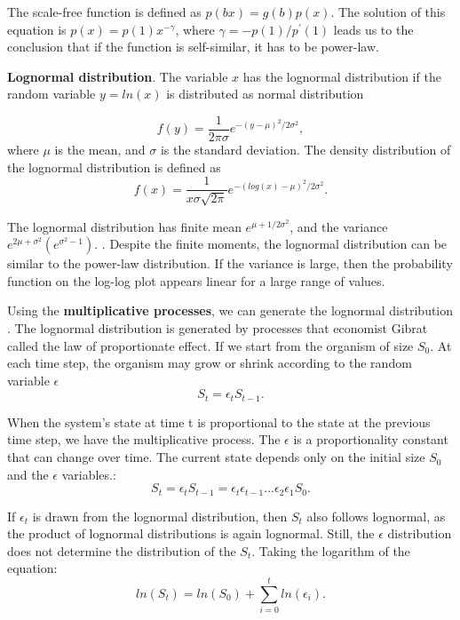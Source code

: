 The scale-free function is defined as $p(bx) = g(b)p(x)$. The solution of this equation is $p(x)=p(1)x^{-\gamma}$, where  $\gamma=-p(1)/p^{'}(1)$ leads us to the conclusion that if the function is self-similar, it has to be power-law.

\textbf{Lognormal distribution}. The variable $x$ has the lognormal distribution if the random variable $y=ln(x)$ is distributed as normal distribution \cite{limpert2001log} 

\begin{equation}
f(y) = \frac{1}{2\pi\sigma}e^{-(y-\mu)^2/2\sigma^2},
\end{equation}
where $\mu$ is the mean, and $\sigma$ is the standard deviation. The density distribution of the lognormal distribution is defined as
\begin{equation}
f(x) = \frac{1}{x \sigma \sqrt{2\pi}}e^{-(log(x)-\mu)^2 /2\sigma^2} .
\end{equation}

The lognormal distribution has finite mean $e^{\mu+1/2\sigma^2}$, and the variance $e^{2\mu+\sigma^2}(e^{\sigma^2 -1})$.  \cite{mitzenmacher2004brief}. Despite the finite moments, the lognormal distribution can be similar to the power-law distribution. If the variance is large, then the probability function on the log-log plot appears linear for a large range of values. 

Using the \textbf{multiplicative processes}, we can generate the lognormal distribution \cite{caldarelli2007scalefree, mitzenmacher2004brief}. The lognormal distribution is generated by processes that economist Gibrat called the law of proportionate effect. If we start from the organism of size $S_0$. At each time step, the organism may grow or shrink according to the random variable $\epsilon$
\begin{equation}
S_t = \epsilon_t S_{t-1}.
\end{equation}

When the system's state at time t is proportional to the state at the previous time step, we have the multiplicative process. The $\epsilon$ is a proportionality constant that can change over time. The current state depends only on the initial size $S_0$ and the $\epsilon$ variables.:
\begin{equation}
S_t = \epsilon_t S_{t-1} = \epsilon_t \epsilon_{t-1}... \epsilon_2 \epsilon_1 S_{0}.
\end{equation}

If $\epsilon_t$ is drawn from the lognormal distribution, then $S_t$ also follows lognormal, as the product of lognormal distributions is again lognormal. Still, the $\epsilon$ distribution does not determine the distribution of the $S_t$. Taking the logarithm of the equation:
\begin{equation}
ln(S_t) = ln(S_0) + \sum_{i=0}^{t} ln(\epsilon_i).
\end{equation}

